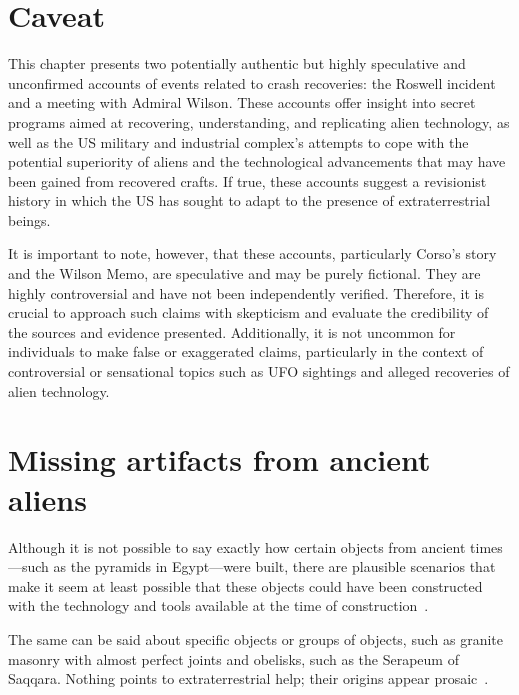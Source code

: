 \section{Caveat}

This chapter presents two potentially authentic but highly speculative and unconfirmed accounts of events related to crash recoveries: the Roswell incident and a meeting with Admiral Wilson. These accounts offer insight into secret programs aimed at recovering, understanding, and replicating alien technology, as well as the US military and industrial complex's attempts to cope with the potential superiority of aliens and the technological advancements that may have been gained from recovered crafts. If true, these accounts suggest a revisionist history in which the US has sought to adapt to the presence of extraterrestrial beings.

It is important to note, however, that these accounts, particularly Corso's story and the Wilson Memo, are speculative and may be purely fictional. They are highly controversial and have not been independently verified. Therefore, it is crucial to approach such claims with skepticism and evaluate the credibility of the sources and evidence presented. Additionally, it is not uncommon for individuals to make false or exaggerated claims, particularly in the context of controversial or sensational topics such as UFO sightings and alleged recoveries of alien technology.

\section{Missing artifacts from ancient aliens}
\label{2023-UFO-part-Perception-crash-retreivals-aa}

Although it is not possible to say exactly how certain objects from ancient times---such as the pyramids in Egypt---were built, there are plausible scenarios that make it seem at least possible that these objects could have been constructed with the technology and tools available at the time of construction~\cite{Arnold1997Feb,Arnold1992}.

The same can be said about specific objects or groups of objects, such as granite masonry with almost perfect joints and obelisks, such as the Serapeum of Saqqara. Nothing points to extraterrestrial help; their origins appear prosaic~\cite{Arnold1988,Arnold1992,Arnold1997Feb,Arnold2000,Arnold2008}.


